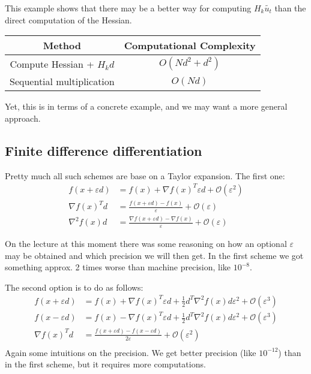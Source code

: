 This example shows that there may be a better way for computing $H_k \tilde{u_t}$ than the direct computation of the Hessian.

\begin{table}[!ht]
    \centering
    \begin{tabular}{c c}
        \toprule
        \textbf{Method} & \textbf{Computational Complexity} \\ 
        \midrule
        Compute Hessian + $H_k d$ & $O(Nd^2 + d^2)$ \\
        Sequential multiplication & $O(Nd)$ \\
        \bottomrule
    \end{tabular}
\end{table}

Yet, this is in terms of a concrete example, and we may want a more general approach.

\subsection{Finite difference differentiation}

Pretty much all such schemes are base on a Taylor expansion. The first one: 
\begin{align*}
    f(x + \varepsilon d) &= f(x) + \nabla f(x)^T \varepsilon d + \mathcal{O}(\varepsilon^2) \\ 
    \nabla f(x)^T d &= \frac{f(x + \varepsilon d) - f(x)}{\varepsilon} + \mathcal{O}(\varepsilon) \\
    \nabla^2 f(x) d &= \frac{\nabla f(x + \varepsilon d) - \nabla f(x)}{\varepsilon} + \mathcal{O}(\varepsilon)
\end{align*}

On the lecture at this moment there was some reasoning on how an optional $\varepsilon$ may be obtained and which precision we will then get. In the first scheme we got something approx. 2 times worse than machine precision, like $10^{-8}$. 

The second option is to do as follows:
\begin{align*}
    f(x + \varepsilon d) &= f(x) + \nabla f(x)^T \varepsilon d + \frac{1}{2} d^T \nabla^2 f(x) d \varepsilon^2 + \mathcal{O}(\varepsilon^3) \\
    f(x - \varepsilon d) &= f(x) - \nabla f(x)^T \varepsilon d + \frac{1}{2} d^T \nabla^2 f(x) d \varepsilon^2 + \mathcal{O}(\varepsilon^3) \\
    \nabla f(x)^T d &= \frac{f(x + \varepsilon d) - f(x - \varepsilon d)}{2 \varepsilon} + \mathcal{O}(\varepsilon^2) \\
\end{align*}
Again some intuitions on the precision. We get better precision (like $10^{-12}$) than in the first scheme, but it requires more computations.

